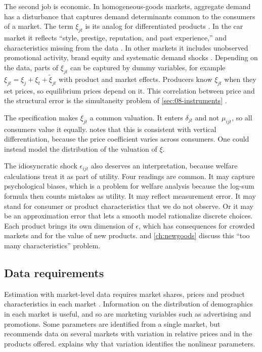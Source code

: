 The second job is economic. In homogeneous-goods markets, aggregate demand has a disturbance that captures
demand determinants common to the consumers of a market. The term $\xi_{jt}$ is its analog for differentiated
products \citep[p.~850]{BerryLevinsohnPakes1995}. In the car market it reflects ``style, prestige,
reputation, and past experience,'' and characteristics missing from the data
\citep[pp.~850--851]{BerryLevinsohnPakes1995}. In other markets it includes unobserved promotional activity,
brand equity and systematic demand shocks \citep[p.~517]{Nevo2000a}. Depending on the data, parts of
$\xi_{jt}$ can be captured by dummy variables, for example $\xi_{jt} = \xi_j + \xi_t + \tilde\xi_{jt}$ with
product and market effects. Producers know $\xi_{jt}$ when they set prices, so equilibrium prices depend on it.
This correlation between price and the structural error is the simultaneity problem of
\cref{sec:08-instruments} \citep[Section~2.2]{BerryLevinsohnPakes1995}.

The specification makes $\xi_{jt}$ a common valuation. It enters $\delta_{jt}$ and not $\mu_{ijt}$, so all
consumers value it equally. \citet[p.~518]{Nevo2000a} notes that this is consistent with vertical
differentiation, because the price coefficient varies across consumers. One could instead model the
distribution of the valuation of $\xi$.

The idiosyncratic shock $\epsilon_{ijt}$ also deserves an interpretation, because welfare calculations treat it
as part of utility. Four readings are common. It may capture psychological biases, which is a problem for
welfare analysis because the log-sum formula then counts mistakes as utility. It may reflect measurement
error. It may stand for consumer or product characteristics that we do not observe. Or it may be an
approximation error that lets a smooth model rationalize discrete choices. Each product brings its own
dimension of $\epsilon$, which has consequences for crowded markets and for the value of new products.
 and \cref{ch:newgoods} discuss this ``too many characteristics'' problem.

\subsection{Data requirements}\label{sec:08-data}

Estimation with market-level data requires market shares, prices and product characteristics in each market
\citep[Section~3.1]{Nevo2000a}. Information on the distribution of demographics in each market is useful, and
so are marketing variables such as advertising and promotions. Some parameters are identified from a single
market, but \citet[pp.~526--527]{Nevo2000a} recommends data on several markets with variation in relative
prices and in the products offered.  explains why that variation identifies the
nonlinear parameters.

